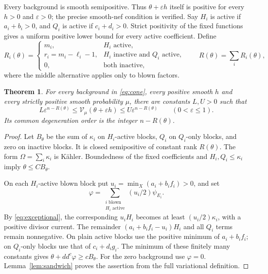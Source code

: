 \documentclass[11pt]{article}
\newtheorem{theorem}{Theorem}
\newcommand{\ddc}{dd^c}
\newcommand{\V}{\mathcal V}
\begin{document}
Every background is smooth semipositive. Thus $\theta+\varepsilon h$
itself is positive for every $h>0$ and $\varepsilon>0$; the precise
smooth-nef condition is verified. Say $H_i$ is active if $a_i+b_i>0$,
and $Q_i$ is active if $c_i+d_i>0$. Strict positivity of the fixed
functions gives a uniform positive lower bound for every active
coefficient. Define
\[
 R_i(\theta)=
 \begin{cases}
 m_i,&H_i\text{ active},\\
 r_i=m_i-\ell_i-1,&H_i\text{ inactive and }Q_i\text{ active},\\
 0,&\text{both inactive},
 \end{cases}
 \qquad R(\theta)=\sum_iR_i(\theta),
\]
where the middle alternative applies only to blown factors.

\begin{theorem}\label{thm:orders}
For every background in \eqref{eq:cone}, every positive smooth
$h$ and every strictly positive smooth probability $\mu$, there
are constants $L,U>0$ such that
\[
 L\varepsilon^{n-R(\theta)}
 \leq\V_\mu(\theta+\varepsilon h)
 \leq U\varepsilon^{n-R(\theta)}\qquad(0<\varepsilon\leq1).
\]
Its common degeneration order is the integer $n-R(\theta)$.
\end{theorem}
\begin{proof}
Let $B_\theta$ be the sum of $\kappa_i$ on $H_i$-active blocks,
$Q_i$ on $Q_i$-only blocks, and zero on inactive blocks. It is
closed semipositive of constant rank $R(\theta)$. The form
$\Omega=\sum_i\kappa_i$ is K\"ahler. Boundedness of the fixed
coefficients and $H_i,Q_i\leq\kappa_i$ imply
$\theta\leq CB_\theta$.

On each $H_i$-active blown block put
$u_i=\min_X(a_i+b_if_i)>0$, and set
\[
 \varphi=\sum_{\substack{i\text{ blown}\\H_i\text{ active}}}
                                                   (u_i/2)\psi_{E_i}.
\]
By \eqref{eq:exceptional}, the corresponding $u_iH_i$ becomes
at least $(u_i/2)\kappa_i$, with a positive divisor current. The
remainder $(a_i+b_if_i-u_i)H_i$ and all $Q_i$ terms remain
nonnegative. On plain active blocks use the positive minimum of
$a_i+b_if_i$; on $Q_i$-only blocks use that of $c_i+d_ig_i$.
The minimum of these finitely many constants gives
$\theta+\ddc\varphi\geq cB_\theta$.
For the zero background use $\varphi=0$. Lemma~\ref{lem:sandwich}
proves the assertion from the full variational definition.
\end{proof}
\end{document}
